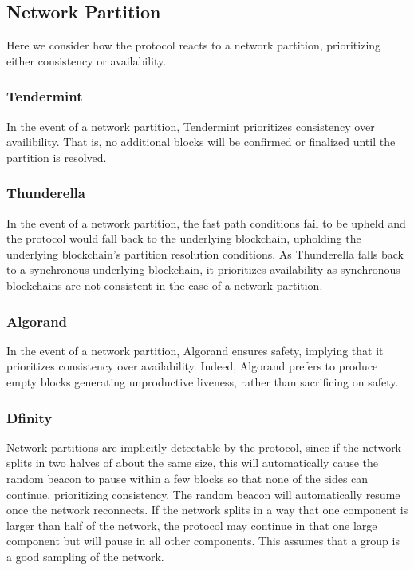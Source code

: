 \documentclass[10pt,journal,compsoc]{IEEEtran}
\begin{document}
\subsection{Network Partition}
Here we consider how the protocol reacts to a network partition, prioritizing either consistency or availability. 

\subsubsection{Tendermint} In the event of a network partition, Tendermint prioritizes consistency over availibility. That is, no additional blocks will be confirmed or finalized until the partition is resolved. 

\subsubsection{Thunderella} In the event of a network partition, the fast path conditions fail to be upheld and the protocol would fall back to the underlying blockchain, upholding the underlying blockchain's partition resolution conditions. As Thunderella falls back to a synchronous underlying blockchain, it prioritizes availability as synchronous blockchains are not consistent in the case of a network partition.   

\subsubsection{Algorand}
In the event of a network partition, Algorand ensures safety, implying that it prioritizes consistency over availability. Indeed, Algorand prefers to produce empty blocks generating unproductive liveness, rather than sacrificing on safety.

\subsubsection{Dfinity} Network partitions are implicitly detectable by the protocol, since if the network splits in two halves of about the same size, this will automatically cause the random beacon to pause within a few blocks so that none of the sides can continue, prioritizing consistency. The random beacon will automatically resume once the network reconnects. If the network splits in a way that one component is larger than half of the network, the protocol may continue in that one large component but will pause in all other components. This assumes that a group is a good sampling of the network. 
\end{document}
